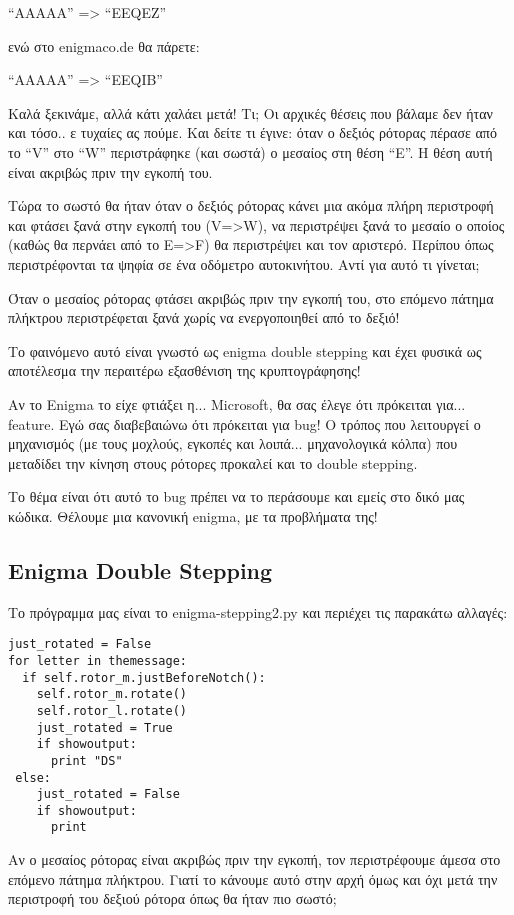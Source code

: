 \documentclass[a4paper,twoside,12pt]{article}
\begin{document}
“AAAAA” => “EEQEZ”

ενώ στο enigmaco.de θα πάρετε:

“AAAAA” => “EEQIB”

Καλά ξεκινάμε, αλλά κάτι χαλάει μετά! Τι; Οι αρχικές θέσεις που βάλαμε δεν ήταν και τόσο.. ε τυχαίες ας πούμε.  Και δείτε τι έγινε: όταν ο δεξιός ρότορας πέρασε από το “V” στο “W” περιστράφηκε (και σωστά) ο μεσαίος στη θέση “Ε”. Η θέση αυτή είναι ακριβώς πριν την εγκοπή του.

Τώρα το σωστό θα ήταν όταν ο δεξιός ρότορας κάνει μια ακόμα πλήρη περιστροφή και φτάσει ξανά στην εγκοπή του (V=>W), να περιστρέψει ξανά το μεσαίο ο οποίος (καθώς θα περνάει από το E=>F) θα περιστρέψει και τον αριστερό. Περίπου όπως περιστρέφονται τα ψηφία σε ένα οδόμετρο αυτοκινήτου. Αντί για αυτό τι γίνεται;

Όταν ο μεσαίος ρότορας φτάσει ακριβώς πριν την εγκοπή του, στο επόμενο πάτημα πλήκτρου περιστρέφεται ξανά χωρίς να ενεργοποιηθεί από το δεξιό!

Το φαινόμενο αυτό είναι γνωστό ως enigma double stepping και έχει φυσικά ως αποτέλεσμα την περαιτέρω εξασθένιση της κρυπτογράφησης!

Αν το Enigma το είχε φτιάξει η... Microsoft, θα σας έλεγε ότι πρόκειται για... feature. Εγώ σας διαβεβαιώνω ότι πρόκειται για bug! Ο τρόπος που λειτουργεί ο μηχανισμός (με τους μοχλούς, εγκοπές και λοιπά... μηχανολογικά κόλπα) που μεταδίδει την κίνηση στους ρότορες προκαλεί και το double stepping.

Το θέμα είναι ότι αυτό το bug πρέπει να το περάσουμε και εμείς στο δικό μας κώδικα. Θέλουμε μια κανονική enigma, με τα προβλήματα της!

\subsection{Enigma Double Stepping}

Το πρόγραμμα μας είναι το enigma-stepping2.py και περιέχει τις παρακάτω αλλαγές:

\begin{verbatim}
just_rotated = False
for letter in themessage:
  if self.rotor_m.justBeforeNotch():
    self.rotor_m.rotate()
    self.rotor_l.rotate()
    just_rotated = True
    if showoutput:
      print "DS"
 else:
    just_rotated = False
    if showoutput:
      print
\end{verbatim}

Αν ο μεσαίος ρότορας είναι ακριβώς πριν την εγκοπή, τον περιστρέφουμε άμεσα στο επόμενο πάτημα πλήκτρου. Γιατί το κάνουμε αυτό στην αρχή όμως και όχι μετά την περιστροφή του δεξιού ρότορα όπως θα ήταν πιο σωστό;
\end{document}
